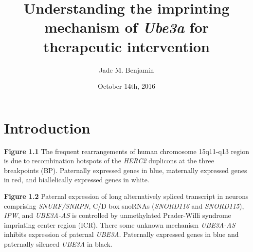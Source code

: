 \documentclass{beamer}
\title{Understanding the imprinting mechanism of \textit{Ube3a} for therapeutic intervention}
\author{Jade M. Benjamin}
\institute[TAMU]{
  Texas A\&M University
  \and
  Department of Veterinary Pathobiology\\
  Interdisciplinary Genetics Program
}
\date{October 14th, 2016}
\begin{document}
\frame{\titlepage}

\section{Introduction}

\begin{frame}

  \begin{block}{\textbf{Figure 1.1}}
  The frequent rearrangements of human chromosome 15q11-q13 region is due to recombination hotspots of the \textit{HERC2} duplicons at the three breakpoints (BP). Paternally expressed genes in blue, maternally expressed genes in red, and biallelically expressed genes in white.
  \end{block}
\end{frame}

\begin{frame}
  
  \begin{block}{\textbf{Figure 1.2}}
  Paternal expression of long alternatively spliced transcript in neurons comprising \textit{SNURF/SNRPN}, C/D box snoRNAs (\textit{SNORD116} and \textit{SNORD115}), \textit{IPW}, and \textit{UBE3A-AS} is controlled by unmethylated Prader-Willi syndrome imprinting center region (ICR). There some unknown mechanism \textit{UBE3A-AS} inhibits expression of paternal \textit{UBE3A}. Paternally expressed genes in blue and paternally silenced \textit{UBE3A} in black.
  \end{block}
\end{frame}
\end{document}
